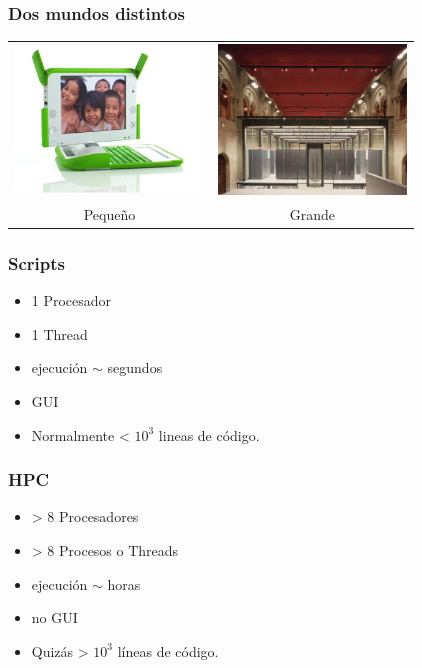 \documentclass{beamer}
\begin{document}
\begin{frame}
 \frametitle{Dos mundos distintos}
\begin{center}
 \begin{tabular}[h]{cc}
   \includegraphics[width=5cm]{files/nigerian-machine.jpg} &
   \includegraphics[width=5cm]{files/marenostrum.jpg}\\
   Pequeño & Grande
 \end{tabular}
\end{center}
\end{frame}

\begin{frame}
\frametitle{Scripts}
\begin{itemize}
\item 1 Procesador
\item 1 Thread
\item ejecución $\sim$ segundos
\item GUI
\item Normalmente < $10^3$ lineas de código.
\end{itemize}
\end{frame}

\begin{frame}
\frametitle{HPC}
\begin{itemize}
\item > 8 Procesadores
\item > 8 Procesos o Threads
\item ejecución $\sim$ horas
\item no GUI
\item Quizás > $10^3$ líneas de código.
\end{itemize}
\end{frame}
\end{document}

